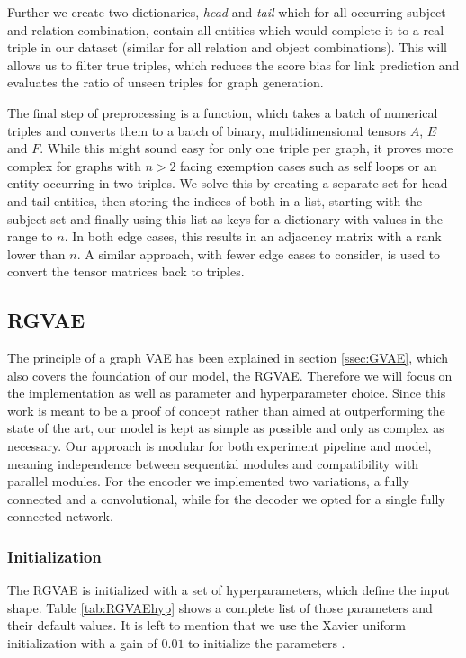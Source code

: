 Further we create two dictionaries, \textit{head} and \textit{tail} which for all occurring subject and relation combination, contain all entities which would complete it to a real triple in our dataset (similar for all relation and object combinations). This will allows us to filter true triples, which reduces the score bias for link prediction and evaluates the ratio of unseen triples for graph generation. 

The final step of preprocessing is a function, which takes a batch of numerical triples and converts them to a batch of binary, multidimensional tensors $A$, $E$ and $F$. While this might sound easy for only one triple per graph, it proves more complex for graphs with $n>2$ facing exemption cases such as self loops or an entity occurring in two triples. We solve this by creating a separate set for head and tail entities, then storing the indices of both in a list, starting with the subject set and finally using this list as keys for a dictionary with values in the range to $n$. In both edge cases, this results in an adjacency matrix with a rank lower than $n$. A similar approach, with fewer edge cases to consider, is used to convert the tensor matrices back to triples.


\subsection{RGVAE}
The principle of a graph VAE has been explained in section \ref{ssec:GVAE}, which also covers the foundation of our model, the RGVAE. Therefore we will focus on the implementation as well as parameter and hyperparameter choice. Since this work is meant to be a proof of concept rather than aimed at outperforming the state of the art, our model is kept as simple as possible and only as complex as necessary. Our approach is modular for both experiment pipeline and model, meaning independence between sequential modules and compatibility with parallel modules. For the encoder we implemented two variations, a fully connected and a convolutional, while for the decoder we opted for a single fully connected network.

\subsubsection{Initialization}

The RGVAE is initialized with a set of hyperparameters, which define the input shape. Table \ref{tab:RGVAEhyp} shows a complete list of those parameters and their default values. It is left to mention that we use the Xavier uniform initialization with a gain of $0.01$ to initialize the parameters \cite{glorot2010understanding}.

